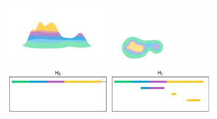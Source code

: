 \begin{figure}[htbp]
  \centering
  \includegraphics[trim=200 200 200 200, clip, width=0.5\textwidth]{scripts/figures/surf/side.png}
  \includegraphics[trim=200 0 200 200, clip, width=0.3\textwidth]{scripts/figures/surf/top.png}
  \includegraphics[scale=0.75]{scripts/figures/scalar_barcode_true.png}
\end{figure}
